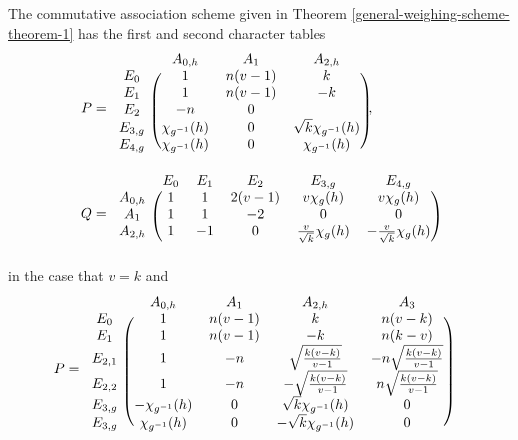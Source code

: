 \documentclass[../../../main]{subfiles}
\begin{document}
\begin{thm}\label{general-weighing-scheme-theorem-2}
 The commutative association scheme given in Theorem \ref{general-weighing-scheme-theorem-1} has the first and second character tables
 \begin{align*}
  P &=
  \begin{blockarray}{cccc}
   & A_{0,h} & A_1 & A_{2,h} \\
   \begin{block}{c(ccc)}
    E_0 & 1 & n(v-1) & k \\
    E_1 & 1 & n(v-1) & -k \\
    E_2 & -n & 0 \\
    E_{3,g} & \chi_{g^{-1}}(h) & 0 & \sqrt{k}\chi_{g^{-1}}(h) \\
    E_{4,g} & \chi_{g^{-1}}(h) & 0 & \chi_{g^{-1}}(h) \\
   \end{block}
  \end{blockarray}, \\
  Q &= 
  \begin{blockarray}{cccccc}
   & E_0 & E_1 & E_2 & E_{3,g} & E_{4,g} \\
   \begin{block}{c(ccccc)}
    A_{0,h} & 1 & 1 & 2(v-1) & v\chi_g(h) & v\chi_g(h) \\
    A_1 & 1 & 1 & -2 & 0 & 0 \\
    A_{2,h} & 1 & -1 & 0 & \frac{v}{\sqrt{k}}\chi_g(h) & -\frac{v}{\sqrt{k}}\chi_g(h) \\
   \end{block}
  \end{blockarray}
 \end{align*}
 in the case that $v=k$ and
 \begin{align*}
  P &=
  \begin{blockarray}{ccccc}
   & A_{0,h} & A_1 & A_{2,h} & A_3 \\
   \begin{block}{c(cccc)}
    E_0 & 1 & n(v-1) & k & n(v-k) \\
    E_1 & 1 & n(v-1) & -k & n(k-v) \\
    E_{2,1} & 1 & -n & \sqrt{\frac{k(v-k)}{v-1}} & -n\sqrt{\frac{k(v-k)}{v-1}} \\
    E_{2,2} & 1 & -n & -\sqrt{\frac{k(v-k)}{v-1}} & n\sqrt{\frac{k(v-k)}{v-1}} \\
    E_{3,g} & -\chi_{g^{-1}}(h) & 0 & \sqrt{k}\chi_{g^{-1}}(h) & 0 \\
    E_{3,g} & \chi_{g^{-1}}(h) & 0 & -\sqrt{k}\chi_{g^{-1}}(h) & 0 \\

\end{block}
\end{blockarray}
\end{align*}
\end{thm}
\end{document}
